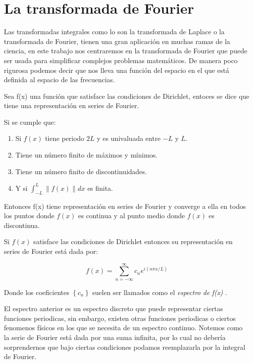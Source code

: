 \section{La transformada de Fourier}
\label{La transformada de Fourier}

Las transformadas integrales como lo son la transformada de Laplace o la transformada de Fourier, tienen una
gran aplicación en muchas ramas de la ciencia, en este trabajo nos centraremos en la transformada de Fourier
que puede ser usada para simplificar complejos problemas matemáticos. De manera poco rigurosa podemos decir
que nos lleva una función del espacio en el que está definida al espacio de las frecuencias.


Sea f(x) una función que satisface las condiciones de Dirichlet, entoces se dice que tiene una
representación en series de Fourier.


\begin{theorem}
  Si se cumple que:
  \begin{enumerate}
    \item Si $f(x)$ tiene periodo $2L$ y es univaluada entre $-L$ y $L$.
    \item Tiene un número finito de máximos y mínimos.
    \item Tiene un número finito de discontinuidades.
    \item Y si $\int_{-L}^{L} \| f(x) \| dx $ es finita.
  \end{enumerate}
  Entonces f(x) tiene representación en series de Fourier y converge a ella en todos los puntos donde
  $f(x)$ es continua y al punto medio donde $f(x)$ es discontinua.
\end{theorem}


\begin{definition}
  Si $f(x)$ satisface las condiciones de Dirichlet entonces su representación en series de Fourier está dada por:

  \begin{equation}
    f(x) = \sum_{n = -\infty}^{\infty} c_{n} e^{i\left( n\pi x / L \right) }
  \end{equation}

\end{definition}


Donde los coeficientes $\left\{ c_{n} \right\}$ suelen ser llamados como el \emph{espectro de f(x)} .


El espectro anterior es un espectro discreto que puede representar ciertas funciones periodicas, sin embargo, existen
otras funciones periodicas o ciertos fenomenos físicos en los que se necesita de un espectro continuo. Notemos
como la serie de Fourier está dada por una suma infinita, por lo cual no debería sorprendernos que bajo ciertas
condiciones podamos reemplazarla por la integral de Fourier.


